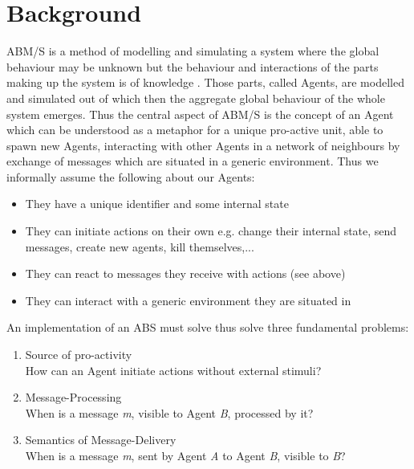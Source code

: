 \section{Background}
ABM/S is a method of modelling and simulating a system where the global behaviour may be unknown but the behaviour and interactions of the parts making up the system is of knowledge \cite{wooldridge_introduction_2009}. Those parts, called Agents, are modelled and simulated out of which then the aggregate global behaviour of the whole system emerges. Thus the central aspect of ABM/S is the concept of an Agent which can be understood as a metaphor for a unique pro-active unit, able to spawn new Agents, interacting with other Agents in a network of neighbours by exchange of messages which are situated in a generic environment. Thus we informally assume the following about our Agents:

\begin{itemize}
	\item They have a unique identifier and some internal state
	\item They can initiate actions on their own e.g. change their internal state, send messages, create new agents, kill themselves,...
	\item They can react to messages they receive with actions (see above)
	\item They can interact with a generic environment they are situated in
\end{itemize} 

An implementation of an ABS must solve thus solve three fundamental problems:
\begin{enumerate}
	\item Source of pro-activity \\ How can an Agent initiate actions without external stimuli?
	\item Message-Processing \\ When is a message \textit{m}, visible to Agent \textit{B}, processed by it?
	\item Semantics of Message-Delivery \\ When is a message \textit{m}, sent by Agent \textit{A} to Agent \textit{B}, visible to \textit{B}?
\end{enumerate}

